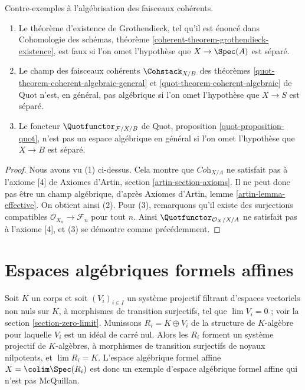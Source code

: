 \begin{lemma}
\label{lemma-counter-Grothendieck-existence}
Contre-exemples à l'algébrisation des faisceaux cohérents.
\begin{enumerate}
\item Le théorème d'existence de Grothendieck, tel qu'il est énoncé dans
Cohomologie des schémas, théorème \ref{coherent-theorem-grothendieck-existence},
est faux si l'on omet l'hypothèse que $X \to \Spec(A)$ est séparé.
\item Le champ des faisceaux cohérents $\Cohstack_{X/B}$ des
théorèmes \ref{quot-theorem-coherent-algebraic-general} et
\ref{quot-theorem-coherent-algebraic} de Quot n'est, en général,
pas algébrique si l'on omet l'hypothèse que $X \to S$ est séparé.
\item Le foncteur $\Quotfunctor_{\mathcal{F}/X/B}$ de
Quot, proposition \ref{quot-proposition-quot},
n'est pas un espace algébrique en général si l'on omet l'hypothèse
que $X \to B$ est séparé.
\end{enumerate}
\end{lemma}

\begin{proof}
Nous avons vu (1) ci-dessus. Cela montre que $\textit{Coh}_{X/A}$
ne satisfait pas à l'axiome [4] de Axiomes d'Artin,
section \ref{artin-section-axioms}. Il ne peut donc pas être un champ algébrique, d'après Axiomes d'Artin, lemme
\ref{artin-lemma-effective}. On obtient ainsi (2).
Pour (3), remarquons qu'il existe des surjections compatibles
$\mathcal{O}_{X_n} \to \mathcal{F}_n$ pour tout $n$.
Ainsi $\Quotfunctor_{\mathcal{O}_X/X/A}$ ne satisfait pas à
l'axiome [4], et (3) se démontre comme précédemment.
\end{proof}






\section{Espaces algébriques formels affines}
\label{section-affine-formal-algebraic-space}

\noindent
Soit $K$ un corps et soit $(V_i)_{i \in I}$ un système projectif filtrant
d'espaces vectoriels non nuls sur $K$, à morphismes de transition surjectifs,
tel que $\lim V_i = 0$ ; voir la section \ref{section-zero-limit}.
Munissons $R_i = K \oplus V_i$ de la structure de $K$-algèbre pour laquelle
$V_i$ est un idéal de carré nul. Alors les $R_i$ forment un système projectif
de $K$-algèbres, à morphismes de transition surjectifs de noyaux nilpotents,
et $\lim R_i = K$. L'espace algébrique formel affine
$X = \colim \Spec(R_i)$ est donc un exemple d'espace
algébrique formel affine qui n'est pas McQuillan.

